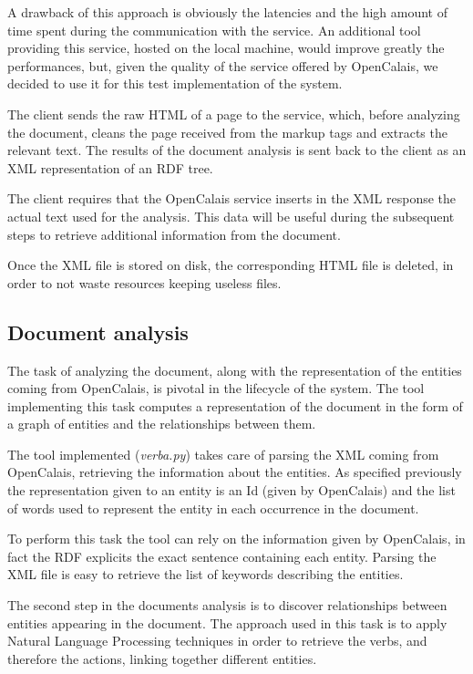 \documentclass{acm_proc_article-sp-sigmod07}
\begin{document}
A drawback of this approach is obviously the latencies and the high amount
of time spent during the communication with the service. An additional
tool providing this service, hosted on the local machine, would improve
greatly the performances, but, given the quality of the service offered by
OpenCalais, we decided to use it for this test implementation of the
system.

The client sends the raw HTML of a page to the service, which, before
analyzing the document, cleans the page received from the markup tags and
extracts the relevant text.
The results of the document analysis is sent back to the client as an XML
representation of an RDF tree. 

The client requires that the OpenCalais service inserts in the XML
response the actual text used for the analysis. This data will be useful
during the subsequent steps to retrieve additional information from the
document.

Once the XML file is stored on disk, the corresponding HTML file is
deleted, in order to not waste resources keeping useless files.

\subsection{Document analysis}
The task of analyzing the document, along with the representation of the
entities coming from OpenCalais, is pivotal in the lifecycle of the
system. The tool implementing this task computes a representation of the
document in the form of a graph of entities and the relationships between
them.

The tool implemented (\emph{verba.py}) takes care of parsing the XML
coming from OpenCalais, retrieving the information about the entities.
As specified previously the representation given to an entity is an Id
(given by OpenCalais) and the list of words used to represent the entity
in each occurrence in the document.

To perform this task the tool can rely on the information given by
OpenCalais, in fact the RDF explicits the exact sentence containing each
entity.
Parsing the XML file is easy to retrieve the list of keywords describing
the entities.

The second step in the documents analysis is to discover relationships
between entities appearing in the document. The approach used in this
task is to apply Natural Language Processing techniques in order to
retrieve the verbs, and therefore the actions, linking together different
entities.
\end{document}
